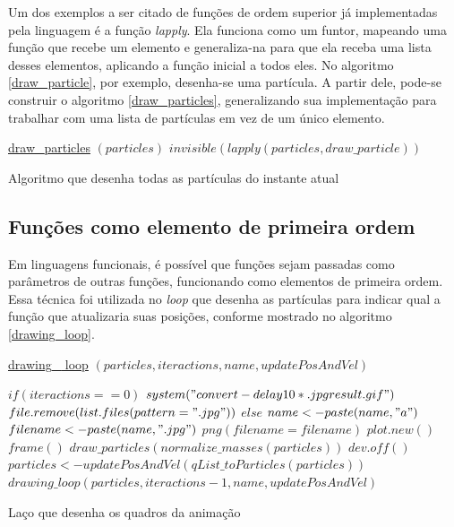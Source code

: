 \documentclass[rel_mlp]{iiufrgs}
\begin{document}
    Um dos exemplos a ser citado de funções de ordem superior já implementadas pela linguagem é a função \textit{lapply}. Ela funciona como um funtor, mapeando uma função que recebe um elemento e generaliza-na para que ela receba uma lista desses elementos, aplicando a função inicial a todos eles. No algoritmo \ref{draw_particle}, por exemplo, desenha-se uma partícula. A partir dele, pode-se construir o algoritmo \ref{draw_particles}, generalizando sua implementação para trabalhar com uma lista de partículas em vez de um único elemento.

    \begin{algorithm}
	\label{draw_particles}
    \underline{draw{\_}particles} $(particles)$\;
	$invisible(lapply(particles, draw{\_}particle)) $\;
	\caption{Algoritmo que desenha todas as partículas do instante atual}
	\end{algorithm}

	\subsection{Funções como elemento de primeira ordem}

    Em linguagens funcionais, é possível que funções sejam passadas como parâmetros de outras funções, funcionando como elementos de primeira ordem. Essa técnica foi utilizada no \textit{loop} que desenha as partículas para indicar qual a função que atualizaria suas posições, conforme mostrado no algoritmo \ref{drawing_loop}.

    \begin{algorithm}
	  \label{drawing_loop}
    \underline{drawing{\_}
loop} $(particles, iteractions, name, updatePosAndVel)$\;

  $if (iteractions == 0) $\;
  $  system("convert -delay 10 *.jpg result.gif") $\;
  $  file.remove(list.files(pattern=".jpg")) $\;
  $else $\;
  $  name <- paste(name, "a") $\;
  $  filename <- paste(name, ".jpg") $\;
  $  png(filename = filename) $\;
  $  plot.new() $\;
  $  frame() $\;
  $  draw{\_}particles(normalize{\_}masses(particles)) $\;
  $  dev.off() $\;
  $  particles <- updatePosAndVel(qList{\_}toParticles(particles)) $\;
  $  drawing{\_}loop(particles, iteractions-1, name, updatePosAndVel) $\;
    \caption{Laço que desenha os quadros da animação}
    \end{algorithm}
\end{document}
